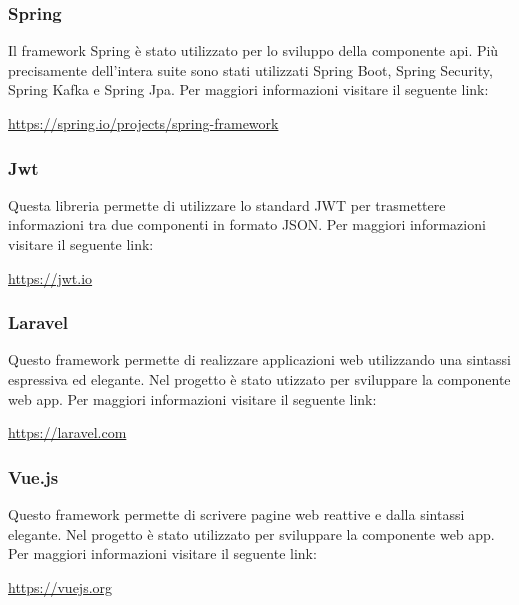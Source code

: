 		\subsubsection{Spring}
			Il framework Spring è stato utilizzato per lo sviluppo della componente api. Più precisamente dell'intera suite sono stati utilizzati Spring Boot, Spring Security, Spring Kafka e Spring Jpa.
			\newline
			Per maggiori informazioni visitare il seguente link:
			\newline
			\begin{center}
				\url{https://spring.io/projects/spring-framework}
			\end{center}
		\subsubsection{Jwt}
			Questa libreria permette di utilizzare lo standard JWT per trasmettere informazioni tra due componenti in formato JSON.
			\newline
			Per maggiori informazioni visitare il seguente link:
			\newline
			\begin{center}
				\url{https://jwt.io}
			\end{center}
		\subsubsection{Laravel}
			Questo framework permette di realizzare applicazioni web utilizzando una sintassi espressiva ed elegante. Nel progetto è stato utizzato per sviluppare la componente web app.
			\newline
			Per maggiori informazioni visitare il seguente link:
			\newline
			\begin{center}
				\url{https://laravel.com}
			\end{center}
		\subsubsection{Vue.js}
			Questo framework permette di scrivere pagine web reattive e dalla sintassi elegante. Nel progetto è stato utilizzato per sviluppare la componente web app.
			\newline
			Per maggiori informazioni visitare il seguente link:
			\newline
			\begin{center}
				\url{https://vuejs.org}
			\end{center}
